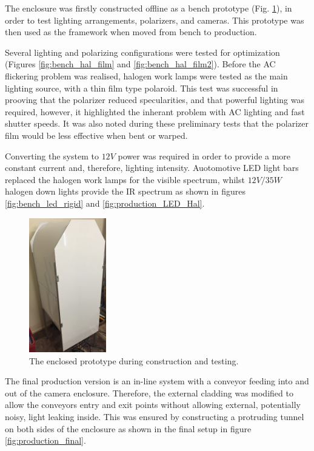 \documentclass[fleqn,twoside]{article}
\begin{document}
The enclosure was firstly constructed offline as a bench prototype (Fig. \ref{fig:bench_construct}), in order to test lighting arrangements, polarizers, and cameras. This prototype was then used as the framework when moved from bench to production. 

Several lighting and polarizing configurations were tested for optimization (Figures \ref{fig:bench_hal_film} and \ref{fig:bench_hal_film2}). Before the AC flickering problem was realised, halogen work lamps were tested as the main lighting source, with a thin film type polaroid. This test was successful in prooving that the polarizer reduced specularities, and that powerful lighting was required, however, it highlighted the inherant problem with AC lighting and fast shutter speeds. It was also noted during these preliminary tests that the polarizer film would be less effective when bent or warped.  

Converting the system to $12V$ power was required in order to provide a more constant current and, therefore, lighting intensity. Auotomotive LED light bars replaced the halogen work lamps for the visible spectrum, whilst $12V/35W$ halogen down lights provide the IR spectrum as shown in figures \ref{fig:bench_led_rigid} and \ref{fig:production_LED_Hal}. 

\begin{figure}
	\begin{center}
		\includegraphics[width=0.3\textwidth]{images/bench_construct.jpg}
	\end{center}
	\caption{The enclosed prototype during construction and testing.}
	\label{fig:bench_construct}
\end{figure}   

The final production version is an in-line system with a conveyor feeding into and out of the camera enclosure. Therefore, the external cladding was modified to allow the conveyors entry and exit points without allowing external, potentially noisy, light leaking inside. This was ensured by constructing a protruding tunnel on both sides of the enclosure as shown in the final setup in figure \ref{fig:production_final}.
\end{document}
